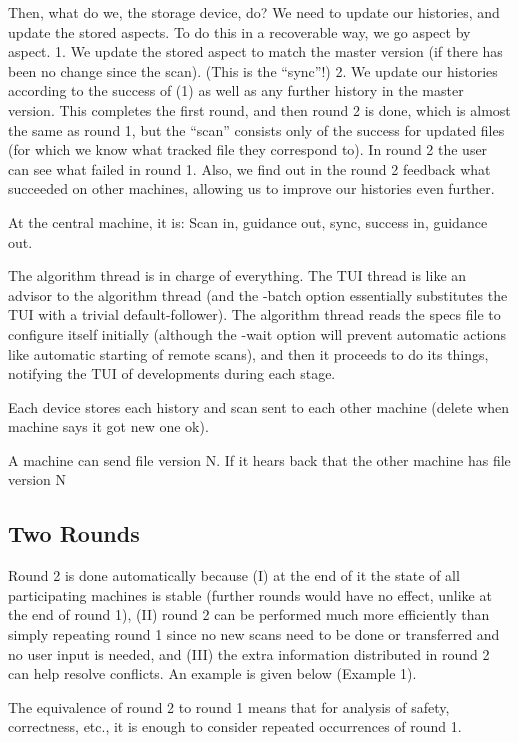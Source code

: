 \documentclass{book}
\begin{document}
Then, what do we, the storage device, do?
We need to update our histories, and update the stored aspects.  To do this in a recoverable way, we go aspect by aspect.
	1. We update the stored aspect to match the master version (if there has been no change since the scan).
	   (This is the ``sync''!)
	2. We update our histories according to the success of (1) as well as any further history in the master version.
This completes the first round, and then round 2 is done, which is almost the same as round 1, but the ``scan'' consists only of the success for updated files (for which we know what tracked file they correspond to).
In round 2 the user can see what failed in round 1.
Also, we find out in the round 2 feedback what succeeded on other machines, allowing us to improve our histories even further.

At the central machine, it is: Scan in, guidance out, sync, success in, guidance out.





The algorithm thread is in charge of everything.  The TUI thread is like an advisor to the algorithm thread (and the -batch option essentially substitutes the TUI with a trivial default-follower).  The algorithm thread reads the specs file to configure itself initially (although the -wait option will prevent automatic actions like automatic starting of remote scans), and then it proceeds to do its things, notifying the TUI of developments during each stage.

Each device stores each history and scan sent to each other machine (delete when machine says it got new one ok).

A machine can send file version N.  If it hears back that the other machine has file version N


\subsection{Two Rounds}

Round 2 is done automatically because (I) at the end of it the state of all participating machines is stable (further rounds would have no effect, unlike at the end of round 1), (II) round 2 can be performed much more efficiently than simply repeating round 1 since no new scans need to be done or transferred and no user input is needed, and (III) the extra information distributed in round 2 can help resolve conflicts.  An example is given below (Example 1).

The equivalence of round 2 to round 1 means that for analysis of safety, correctness, etc., it is enough to consider repeated occurrences of round 1.
\end{document}
